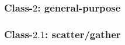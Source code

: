 %


\subsubsection{Class-$2$:   general-purpose}
\label{sec:bg:feature:2}


\subsubsection{Class-$2.1$: scatter/gather}
\label{sec:bg:feature:2:1}

%
%
%


